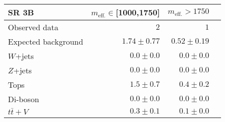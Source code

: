 \begin{tabular*}{\textwidth}{@{\extracolsep{\fill}}lrrr}
\toprule
\textbf{SR 3B} & $m_{\mathrm{eff.}}\in$[1000,1750] & $m_{\mathrm{eff.}}>1750$ \\
\midrule
Observed data          & $2$              & $1$                    \\
\midrule
Expected background         & $1.74 \pm 0.77$          & $0.52 \pm 0.19$              \\
\midrule
        $W$+jets         & $0.0 \pm 0.0$          & $0.0 \pm 0.0$              \\
        $Z$+jets         & $0.0 \pm 0.0$          & $0.0 \pm 0.0$              \\
        Tops         & $1.5 \pm 0.7$          & $0.4 \pm 0.2$              \\
        Di-boson         & $0.0 \pm 0.0$          & $0.0 \pm 0.0$              \\
        $t\bar{t}+V$         & $0.3 \pm 0.1$          & $0.1 \pm 0.0$              \\


\bottomrule
\end{tabular*}




